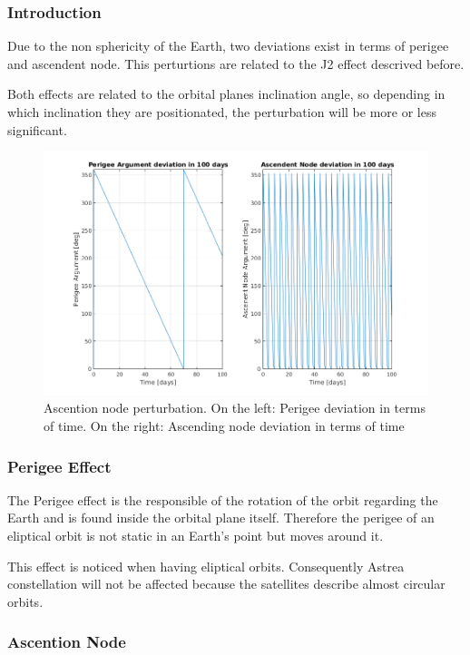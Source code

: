 \subsubsection{Introduction}
Due to the non sphericity of the Earth, two deviations exist in terms of perigee and ascendent node. This perturtions are related to the J2 effect descrived before.

Both effects are related to the orbital planes inclination angle, so depending in which inclination they are positionated, the perturbation will be more or less  significant.

\begin{figure}[H] %
\centering
\includegraphics[width=.8\textwidth]{./decay/Inclination.png}
\caption[Ascention node perturbation]{Ascention node perturbation. On the left: Perigee deviation in terms of time. On the right: Ascending node deviation in terms of time}
\label{fig:Inclination} 
\end{figure}

\subsubsection{Perigee Effect}

The Perigee effect is the responsible of the rotation of the orbit regarding the Earth and is found inside the orbital plane itself. Therefore the perigee of an eliptical orbit is not static in an Earth's point but moves around it. 

This effect is noticed when having eliptical orbits. Consequently Astrea constellation will not be affected because the satellites describe almost circular orbits.


\subsubsection{Ascention Node}

